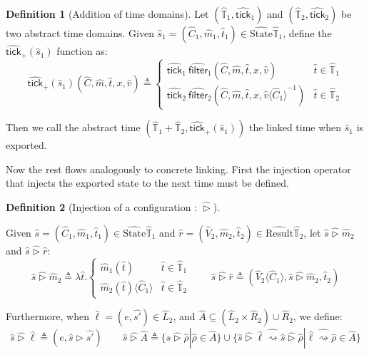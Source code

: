 \documentclass{article}
\theoremstyle{definition}
\newtheorem{definition}{Definition}[section]
\newcommand*{\A}[1]{\widehat{#1}}
\newcommand*{\Time}{\mathbb{T}}
\newcommand*{\ATime}{\A{\Time}}
\newcommand*{\mem}{m}
\newcommand*{\AState}{\widehat{\text{State}}}
\newcommand*{\AResult}{\widehat{\text{Result}}}
\newcommand*{\semarrow}{\rightsquigarrow}
\newcommand*{\tick}{\mathsf{tick}}
\newcommand*{\inject}[2]{{#2}\langle{#1}\rangle}
\newcommand*{\delete}[2]{{#2}{\langle{#1}\rangle}^{-1}}
\newcommand*{\filter}{\mathsf{filter}}
\begin{document}
\begin{definition}[Addition of time domains]
  Let $(\ATime_1,\A\tick_1)$ and $(\ATime_2,\A\tick_2)$ be two abstract time domains.
  Given $\A{s}_1=(\A{C}_1,\A\mem_1,\A{t}_1)\in\AState{\ATime_1}$, define the $\A{\tick}_+(\A{s}_1)$ function as:
  \[
    \A\tick_{+}(\A{s}_1)(\A{C},\A\mem,\A{t},x,\A{v})\triangleq
    \begin{cases}
      \A{\tick}_1\:\A\filter_1(\A{C},\A\mem,\A{t},x,\A{v})                   & \A{t}\in\ATime_1 \\
      \A{\tick}_2\:\A\filter_2(\delete{\A{C}_1}{\A{C},\A\mem,\A{t},x,\A{v}}) & \A{t}\in\ATime_2
    \end{cases}
  \]

  Then we call the abstract time $(\ATime_1+\ATime_2,\A\tick_{+}(\A{s}_1))$ the linked time when $\A{s}_1$ is exported.
\end{definition}

Now the rest flows analogously to concrete linking.
First the injection operator that injects the exported state to the next time must be defined.

\begin{definition}[Injection of a configuration : $\A\rhd$]
  $\:$

  Given $\A{s}=(\A{C}_1,\A{\mem}_1,\A{t}_1)\in\AState{\ATime_1}$ and $\A{r}=(\A{V}_2,\A{\mem}_2,\A{t}_2)\in\AResult{\ATime_2}$,
  let $\A{s}\A\rhd \A{\mem}_2$ and $\A{s}\A\rhd \A{r}$:
  \[
    \A{s}\A\rhd\A{\mem}_2\triangleq
    \lambda \A{t}.
    \begin{cases}
      \A{\mem}_1(\A{t})                   & \A{t}\in\ATime_1 \\
      \inject{\A{C}_1}{\A{\mem}_2(\A{t})} & \A{t}\in\ATime_2
    \end{cases}
    \qquad
    \A{s}\A\rhd \A{r}\triangleq
    (\inject{\A{C}_1}{\A{V}_2},\A{s}\A\rhd \A{\mem}_2,\A{t}_2)
  \]

  Furthermore, when $\A\ell=(e,\A{s'})\in \A{L}_2$, and $\A{A}\subseteq (\A{L}_2\times \A{R}_2)\cup \A{R}_2$, we define:
  \[
    \A{s}\A\rhd\A\ell\triangleq(e,\A{s}\rhd \A{s'})\qquad
    \A{s}\A\rhd\A{A}\triangleq\{\A{s}\A\rhd\A\rho|\A\rho\in \A{A}\}\cup\{\A{s}\A\rhd\A\ell\A\semarrow \A{s}\A\rhd\A\rho|\A\ell\A\semarrow\A\rho\in \A{A}\}
  \]
\end{definition}
\end{document}

